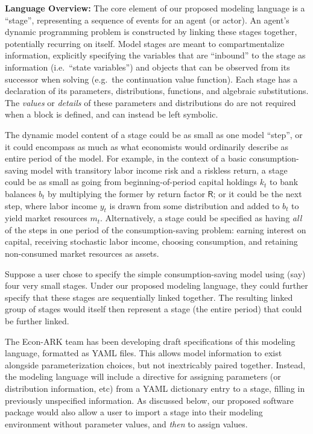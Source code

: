 \documentclass[12pt,pdftex,letterpaper]{article}
\begin{document}
\vspace{0.5cm}

\noindent \textbf{Language Overview:} The core element of our proposed modeling language is a ``stage'', representing a sequence of events for an agent (or actor). An agent's dynamic programming problem is constructed by linking these stages together, potentially recurring on itself. Model stages are meant to compartmentalize information, explicitly specifying the variables that are ``inbound'' to the stage as information (i.e.\ ``state variables'') and objects that can be observed from its successor when solving (e.g.\ the continuation value function). Each stage has a declaration of its parameters, distributions, functions, and algebraic substitutions. The \textit{values} or \textit{details} of these parameters and distributions do are not required when a block is defined, and can instead be left symbolic.

The dynamic model content of a stage could be as small as one model ``step'', or it could encompass as much as what economists would ordinarily describe as entire period of the model. For example, in the context of a basic consumption-saving model with transitory labor income risk and a riskless return, a stage could be as small as going from beginning-of-period capital holdings $k_t$ to bank balances $b_t$ by multiplying the former by return factor $\mathsf{R}$; or it could be the next step, where labor income $y_t$ is drawn from some distribution and added to $b_t$ to yield market resources $m_t$. Alternatively, a stage could be specified as having \textit{all} of the steps in one period of the consumption-saving problem: earning interest on capital, receiving stochastic labor income, choosing consumption, and retaining non-consumed market resources as assets.

Suppose a user chose to specify the simple consumption-saving model using (say) four very small stages. Under our proposed modeling language, they could further specify that these stages are sequentially linked together. The resulting linked group of stages would itself then represent a stage (the entire period) that could be further linked.

The Econ-ARK team has been developing draft specifications of this modeling language, formatted as YAML files. This allows model information to exist alongside parameterization choices, but not inextricably paired together. Instead, the modeling language will include a directive for assigning parameters (or distribution information, etc) from a YAML dictionary entry to a stage, filling in previously unspecified information. As discussed below, our proposed software package would also allow a user to import a stage into their modeling environment without parameter values, and \textit{then} to assign values.
\end{document}

